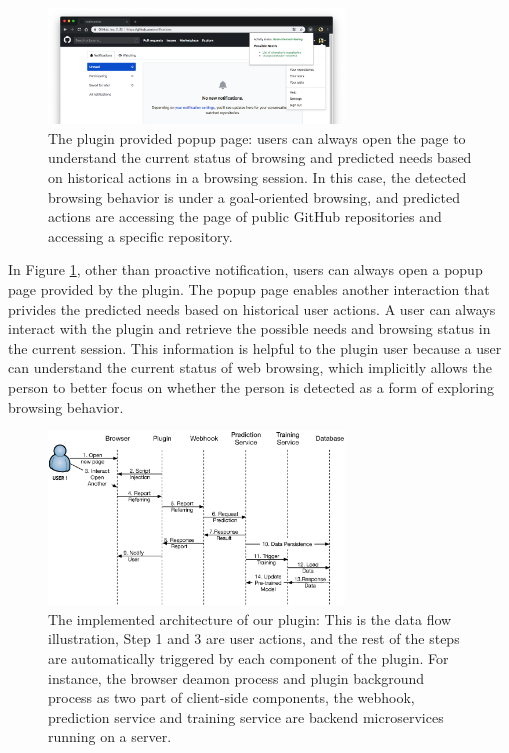 \begin{figure}[H]
    \centering
    \includegraphics[width=0.7\textwidth]{figures/plugin-predicting-result}
    \caption{The plugin provided popup page: users can always open the page
    to understand the current status of browsing and predicted needs based on
    historical actions in a browsing session. In this case, the detected browsing behavior
    is under a goal-oriented browsing, and predicted actions
    are accessing the page of public GitHub repositories and accessing a specific repository.}
    \label{fig:plugin-predict}
\end{figure}

In Figure \ref{fig:plugin-predict}, other than proactive notification, 
users can always open a popup page provided by the plugin.
The popup page enables another interaction that privides the predicted needs 
based on historical user actions. A user can always interact with the plugin and
retrieve the possible needs and browsing status in the current session.
This information is helpful to the plugin user because a user can understand
the current status of web browsing, which implicitly allows the person to better focus
on whether the person is detected as a form of exploring browsing behavior.

\begin{figure}[H]
    \centering
    \includegraphics[width=0.7\textwidth]{figures/arch}
    \caption{The implemented architecture of our plugin: This is the data flow illustration,
    Step 1 and 3 are user actions, and the rest of the steps are automatically triggered by
    each component of the plugin. For instance, the browser deamon process
    and plugin background process as two part of client-side components, the webhook,
    prediction service and training service are backend microservices running on a server.}
    \label{fig:arch}
\end{figure}


